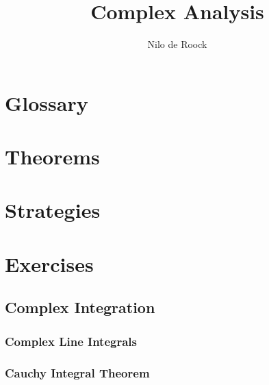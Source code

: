 \documentclass[a4paper,10pt,oneside]{book}
\title{Complex Analysis}
\author{Nilo de Roock}
\date{\Date}
\begin{document}
    \maketitle
    \tableofcontents{}
    \newpage
    \thispagestyle{empty}


    \chapter{Glossary}
    

    \chapter{Theorems}
    

    \chapter{Strategies}

    \chapter{Exercises}
    \section{Complex Integration}

    \subsection{Complex Line Integrals}
    
    
    
    
    
    
    
    
    
    
    

    \subsection{Cauchy Integral Theorem}
    
    
    
    
    
    
    
    
    
    
    
    
    
    
    
    
    
\end{document}
